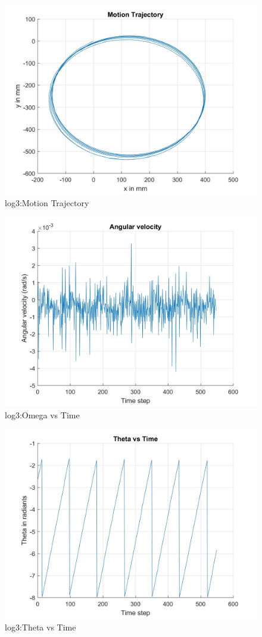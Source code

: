 \documentclass[paper=a4, fontsize=11pt]{scrartcl} %
\numberwithin{equation}{section} %
\numberwithin{figure}{section} %
\numberwithin{table}{section} %
\begin{document}
\begin{appendix}
\begin{figure}[H]
	\centering
	\includegraphics[width = 0.6\linewidth]{./figures/log3/motionTrajectory.jpg}
	\caption{log3:Motion Trajectory}
\end{figure}

\begin{figure}[H]
	\centering
	\includegraphics[width = 0.6\linewidth]{./figures/log3/omegaVsTime.jpg}
	\caption{log3:Omega vs Time}
\end{figure}

\begin{figure}[H]
	\centering
	\includegraphics[width = 0.6\linewidth]{./figures/log3/thetaVsTime.jpg}
	\caption{log3:Theta vs Time}
\end{figure}


\end{appendix}
\end{document}
